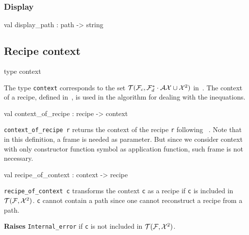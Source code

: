 \subsubsection{Display}




\label{val:Recipe.display-underscorepath}\begin{ocamldoccode}
val display_path : path -> string
\end{ocamldoccode}




\subsection{Recipe context}




\label{type:Recipe.context}\begin{ocamldoccode}
type context 
\end{ocamldoccode}
\begin{ocamldocdescription}
The type {\tt{context}} corresponds to the set $\mathcal{T}(\mathcal{F}_c, \mathcal{F}_d^* \cdot \mathcal{AX} \cup \mathcal{X}^2)$ in~\thesis.
    The context of a recipe, defined in~,  is used in the algorithm 
    for dealing with the inequations.


\end{ocamldocdescription}




\label{val:Recipe.context-underscoreof-underscorerecipe}\begin{ocamldoccode}
val context_of_recipe : recipe -> context
\end{ocamldoccode}
\begin{ocamldocdescription}
{\tt{context\_of\_recipe r}} returns the context of the recipe {\tt{r}} following ~. 
    Note that in this definition, a frame is needed as parameter. But since we consider context with only
    constructor function symbol as application function, such frame is not necessary. 


\end{ocamldocdescription}




\label{val:Recipe.recipe-underscoreof-underscorecontext}\begin{ocamldoccode}
val recipe_of_context : context -> recipe
\end{ocamldoccode}
\begin{ocamldocdescription}
{\tt{recipe\_of\_context c}} transforms the context {\tt{c}} as a recipe if {\tt{c}} is included in $\mathcal{T}(\mathcal{F}, \mathcal{X}^2)$. 
    {\tt{c}} cannot contain a path since one cannot reconstruct a recipe from a path.

{\bf Raises} {\tt{Internal\_error}} if {\tt{c}} is not included in $\mathcal{T}(\mathcal{F}, \mathcal{X}^2)$. 


\end{ocamldocdescription}





